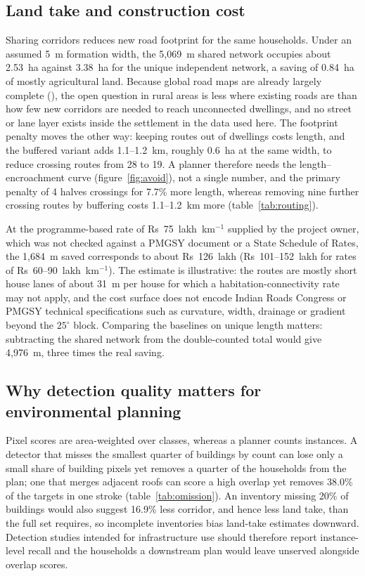 \subsection{Land take and construction cost}
Sharing corridors reduces new road footprint for the same households. Under an assumed 5~m formation width, the 5{,}069~m shared network occupies about 2.53~ha against 3.38~ha for the unique independent network, a saving of 0.84~ha of mostly agricultural land. Because global road maps are already largely complete (\citealt{barrington2017roadmap}), the open question in rural areas is less where existing roads are than how few new corridors are needed to reach unconnected dwellings, and no street or lane layer exists inside the settlement in the data used here. The footprint penalty moves the other way: keeping routes out of dwellings costs length, and the buffered variant adds 1.1--1.2~km, roughly 0.6~ha at the same width, to reduce crossing routes from 28 to 19. A planner therefore needs the length--encroachment curve (figure~\ref{fig:avoid}), not a single number, and the primary penalty of 4 halves crossings for 7.7\% more length, whereas removing nine further crossing routes by buffering costs 1.1--1.2~km more (table~\ref{tab:routing}).

At the programme-based rate of Rs~75~lakh~km$^{-1}$ supplied by the project owner, which was not checked against a PMGSY document or a State Schedule of Rates, the 1{,}684~m saved corresponds to about Rs~126~lakh (Rs~101--152~lakh for rates of Rs~60--90~lakh~km$^{-1}$). The estimate is illustrative: the routes are mostly short house lanes of about 31~m per house for which a habitation-connectivity rate may not apply, and the cost surface does not encode Indian Roads Congress or PMGSY technical specifications such as curvature, width, drainage or gradient beyond the $25^{\circ}$ block. Comparing the baselines on unique length matters: subtracting the shared network from the double-counted total would give 4{,}976~m, three times the real saving.

\subsection{Why detection quality matters for environmental planning}
Pixel scores are area-weighted over classes, whereas a planner counts instances. A detector that misses the smallest quarter of buildings by count can lose only a small share of building pixels yet removes a quarter of the households from the plan; one that merges adjacent roofs can score a high overlap yet removes 38.0\% of the targets in one stroke (table~\ref{tab:omission}). An inventory missing 20\% of buildings would also suggest 16.9\% less corridor, and hence less land take, than the full set requires, so incomplete inventories bias land-take estimates downward. Detection studies intended for infrastructure use should therefore report instance-level recall and the households a downstream plan would leave unserved alongside overlap scores.

